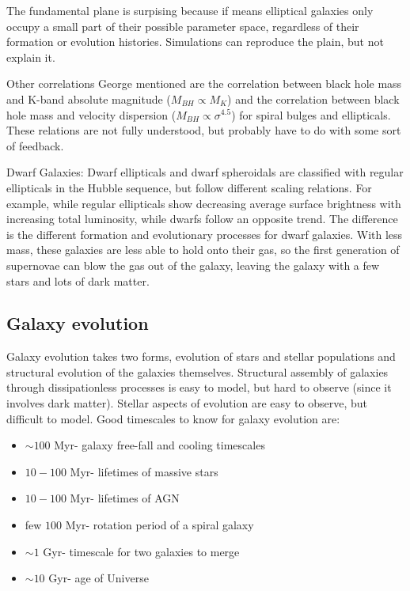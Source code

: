 The fundamental plane is surpising because if means elliptical galaxies 
only occupy a small part of their possible parameter space, regardless of 
their formation or evolution histories.  Simulations can reproduce the plain, 
but not explain it.  

Other correlations George mentioned are the correlation between black hole 
mass and K-band absolute magnitude ($M_{BH}\propto M_K$) and the correlation 
between black hole mass and velocity dispersion ($M_{BH}\propto \sigma^{4.5}$) 
for spiral bulges and ellipticals.  These relations are not fully understood, 
but probably have to do with some sort of feedback.  

Dwarf Galaxies:\newline
Dwarf ellipticals and dwarf spheroidals are classified with regular ellipticals 
in the Hubble sequence, but follow different scaling relations.  For example, 
while regular ellipticals show decreasing average surface brightness with 
increasing total luminosity, while dwarfs follow an opposite trend.  The 
difference is the different formation and evolutionary processes for dwarf 
galaxies.  With less mass, these galaxies are less able to hold onto their gas, 
so the first generation of supernovae can blow the gas out of the galaxy, 
leaving the galaxy with a few stars and lots of dark matter.  

\subsection{Galaxy evolution}
Galaxy evolution takes two forms, evolution of stars and stellar populations 
and structural evolution of the galaxies themselves.  Structural assembly 
of galaxies through dissipationless processes is easy to model, but hard 
to observe (since it involves dark matter).  Stellar aspects of evolution are 
easy to observe, but difficult to model.  Good timescales to know for galaxy 
evolution are:
\begin{itemize}
\item $\sim100$ Myr- galaxy free-fall and cooling timescales
\item $10-100$ Myr- lifetimes of massive stars
\item $10-100$ Myr- lifetimes of AGN
\item few $100$ Myr- rotation period of a spiral galaxy
\item $\sim1$ Gyr- timescale for two galaxies to merge
\item $\sim10$ Gyr- age of Universe
\end{itemize}

